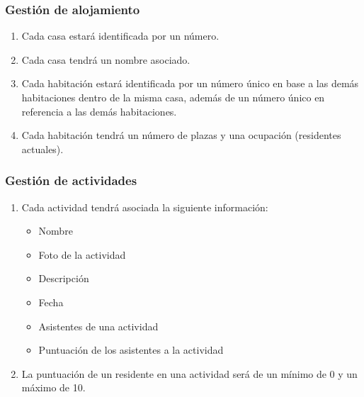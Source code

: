 \subsubsection{Gestión de alojamiento}

\begin{enumerate}[start=15,label={RNF-\arabic*.}]

    \item Cada casa estará identificada por un número.
    \item Cada casa tendrá un nombre asociado.
    \item Cada habitación estará identificada por un número único en base a las demás habitaciones dentro de la misma casa, además de un número único en referencia a las demás habitaciones.
    \item Cada habitación tendrá un número de plazas y una ocupación (residentes actuales).

\end{enumerate}

\subsubsection{Gestión de actividades}

\begin{enumerate}[start=18,label={RNF-\arabic*.}]

    \item Cada actividad tendrá asociada la siguiente información:
        \begin{itemize}
            \item Nombre
            \item Foto de la actividad
            \item Descripción
            \item Fecha
            \item Asistentes de una actividad
            \item Puntuación de los asistentes a la actividad
        \end{itemize}
    \item La puntuación de un residente en una actividad será de un mínimo de 0 y un máximo de 10.

\end{enumerate}